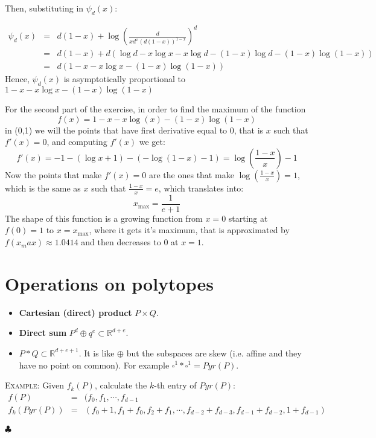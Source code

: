 Then, substituting in $\psi_d(x)$:

\begin{eqnarray*}
\psi_d(x) &=& d(1-x) + \log \left(\frac{d}{xd^x (d(1-x))^{1-x}}\right)^d \\
&=& d(1-x) + d\left(\log{d} - x\log{x} - x\log{d} - (1-x)\log{d} - (1-x) \log{(1-x)}\right)\\
&=& d (1-x-x\log x - (1-x)\log(1-x))
\end{eqnarray*}
Hence, $\psi_d(x)$ is asymptotically proportional to $1-x-x\log x - (1-x)\log(1-x)$
\bigskip

For the second part of the exercise, in order to find the maximum of the function
\begin{equation*}
f(x)=1-x-x\log(x)-(1-x)\log(1-x)
\end{equation*}
in (0,1) we will the points that have first derivative equal to 0, that is $x$ such that $f'(x)=0$, and computing $f'(x)$ we get:
\begin{equation*}
f'(x)=-1-(\log x+1)-(-\log(1-x)-1)=\log\left(\frac{1-x}{x}\right)-1
\end{equation*}
Now the points that make $f'(x)=0$ are the ones that make $\log(\frac{1-x}{x})=1$, which is the same as $x$ such that $\frac{1-x}{x}=e$, which translates into:
\begin{equation*}
x_{\max}=\frac{1}{e+1}
\end{equation*}
The shape of this function is a growing function from $x=0$ starting at $f(0)=1$ to $x=x_{\max}$, where it gets it's maximum, that is approximated by $f(x_max)\approx1.0414$  and then decreases to $0$ at $x=1$.


\section{Operations on polytopes}
\begin{itemize}
\item \textbf{Cartesian (direct) product} $P\times Q$.
\item \textbf{Direct sum} $P^d \oplus q^e \subset \mathbb{R}^{d+e}$.
\item $P*Q\subset \mathbb{R}^{d+e+1}$. It is like $\oplus$ but the subspaces are skew (i.e. affine and they have no point on common). For example $\square^1 *\square^1 = Pyr(P)$.
\end{itemize}

\bigskip
\noindent\textsc{Example}: Given $f_k(P)$, calculate the $k$-th entry of $Pyr(P)$:
\begin{eqnarray*}
f(P)&=&(f_0,f_1,\cdots, f_{d-1}\\
f_k(Pyr(P)) &=& (f_0 +1, f_1 + f_0, f_2+f_1, \cdots, f_{d-2}+ f_{d-3}, f_{d-1}+ f_{d-2}, 1+ f_{d-1})
\end{eqnarray*}
\begin{flushright}
$\clubsuit$
\end{flushright}

